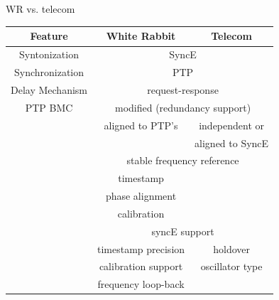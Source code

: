 \documentclass[compress,red]{beamer}
\begin{document}
\subsection{}
\begin{frame}{WR vs. telecom}


    \begin{tabular}{| c | c | c |}          	     \hline
	  {\bf Feature}         &  {\bf White Rabbit }   & {\bf Telecom}               \\ \hline
	  Syntonization         &  \multicolumn{2}{|c|}{SyncE}                         \\ \hline
	  Synchronization        &  \multicolumn{2}{|c|}{PTP}                           \\ \hline
	  Delay Mechanism       &  \multicolumn{2}{|c|}{request-response}               \\ \hline
	  PTP BMC               &  \multicolumn{2}{|c|}{modified (redundancy support)} \\ \hline
   \color{red}{PTP/SyncE planes}&  aligned to PTP's      & independent or              \\ %
	                        &                        & aligned to SyncE           \\ \hline
   \color{red}{SyncE used for}  &  \multicolumn{2}{|c|}{stable frequency reference}    \\ 
                                &  timestamp             &                             \\           
                                &  phase alignment        &                             \\           
                                &  calibration           &                             \\ \hline    
   \color{red}{Boundary Clock}  &  \multicolumn{2}{|c|}{syncE support}                \\                 
                                &  timestamp precision   & holdover                    \\           
                                &  calibration support   & oscillator type             \\         
                                &  frequency loop-back    &                             \\ \hline            
    \end{tabular}

\end{frame}
\end{document}
